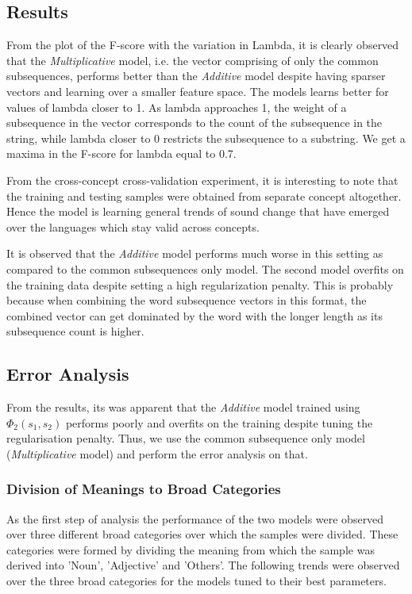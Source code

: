 \documentclass[journal]{IEEEtran}
\begin{document}
\subsection{Results}

From the plot of the F-score with the variation in Lambda, it is clearly observed that the \textit{Multiplicative} model, i.e. the vector comprising of only the common subsequences, performs better than the \textit{Additive} model despite having sparser vectors and learning over a smaller feature space. The models learns better for values of lambda closer to 1. As lambda approaches 1, the weight of a subsequence in the vector corresponds to the count of the subsequence in the string, while lambda closer to 0 restricts the subsequence to a substring. We get a maxima in the F-score for lambda equal to 0.7.

From the cross-concept cross-validation experiment, it is interesting to note that the training and testing samples were obtained from separate concept altogether. Hence the model is learning general trends of sound change that have emerged over the languages which stay valid across concepts. 

It is observed that the \textit{Additive} model performs much worse in this setting as compared to the common subsequences only model. The second model overfits on the training data despite setting a high regularization penalty. This is probably because when combining the word subsequence vectors in this format, the combined vector can get dominated by the word with the longer length as its subsequence count is higher. 

\subsection{Error Analysis}

From the results, its was apparent that the \textit{Additive} model trained using $\Phi_2(s_1, s_2)$ performs poorly and overfits on the training despite tuning the regularisation penalty. Thus, we use the common subsequence only model (\textit{Multiplicative} model) and perform the error analysis on that.

\subsubsection{Division of Meanings to Broad Categories}

As the first step of analysis the performance of the two models were observed over three different broad categories over which the samples were divided. These categories were formed by dividing the meaning from which the sample was derived into 'Noun', 'Adjective' and 'Others'. The following trends were observed over the three broad categories for the models tuned to their best parameters.
\end{document}
